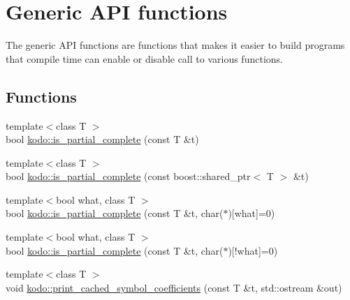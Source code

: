 \hypertarget{group__generic__api}{\section{Generic A\-P\-I functions}
\label{group__generic__api}
}


The generic A\-P\-I functions are functions that makes it easier to build programs that compile time can enable or disable call to various functions.  


\subsection*{Functions}
\begin{DoxyCompactItemize}
\item 
{\footnotesize template$<$class T $>$ }\\bool \hyperlink{group__generic__api_ga1f174dc461330b794c554960156ccd8f}{kodo\-::is\-\_\-partial\-\_\-complete} (const T \&t)
\item 
{\footnotesize template$<$class T $>$ }\\bool \hyperlink{group__generic__api_ga34033f038598eb0310780c63fdf0ab55}{kodo\-::is\-\_\-partial\-\_\-complete} (const boost\-::shared\-\_\-ptr$<$ T $>$ \&t)
\begin{DoxyCompactList}\small\item\em \end{DoxyCompactList}\item 
{\footnotesize template$<$bool what, class T $>$ }\\bool \hyperlink{group__generic__api_ga50c2d14a04778fbb6c4bf53fe5cdfac1}{kodo\-::is\-\_\-partial\-\_\-complete} (const T \&t, char($\ast$)\mbox{[}what\mbox{]}=0)
\begin{DoxyCompactList}\small\item\em \end{DoxyCompactList}\item 
{\footnotesize template$<$bool what, class T $>$ }\\bool \hyperlink{group__generic__api_ga736c9a71c804eb6f190208a808a7ff47}{kodo\-::is\-\_\-partial\-\_\-complete} (const T \&t, char($\ast$)\mbox{[}!what\mbox{]}=0)
\begin{DoxyCompactList}\small\item\em \end{DoxyCompactList}\item 
{\footnotesize template$<$class T $>$ }\\void \hyperlink{group__generic__api_ga0f23c8aa6a9df27288999a56ef0a0dfa}{kodo\-::print\-\_\-cached\-\_\-symbol\-\_\-coefficients} (const T \&t, std\-::ostream \&out)

\end{DoxyCompactItemize}
